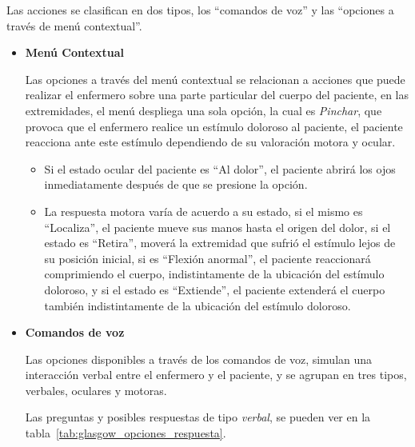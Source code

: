 Las acciones se clasifican en dos tipos, los \enquote{comandos de voz} y las
\enquote{opciones a través de menú contextual}. 

\begin{itemize}
\item{\textbf{Menú Contextual}}

Las opciones a través del menú contextual se relacionan a acciones que puede
realizar el enfermero sobre una parte particular del cuerpo del paciente, en las
extremidades, el menú despliega una sola opción, la cual es \emph{Pinchar}, que
provoca que el enfermero realice un estímulo doloroso al paciente, el
paciente reacciona ante este estímulo dependiendo de su valoración motora y
ocular. 

\begin{itemize}
    \item Si el estado ocular del paciente es \enquote{Al dolor}, el paciente
        abrirá los ojos inmediatamente después de que se presione la opción. 
    \item  La respuesta motora varía de acuerdo a su estado, si el mismo es
        \enquote{Localiza}, el paciente mueve sus manos hasta el origen del
        dolor, si el estado es \enquote{Retira}, moverá la extremidad que
        sufrió el estímulo lejos de su posición inicial, si es
        \enquote{Flexión anormal}, el paciente reaccionará comprimiendo el
        cuerpo, indistintamente de la ubicación del estímulo doloroso, y si el
        estado es \enquote{Extiende}, el paciente extenderá el cuerpo también 
        indistintamente de la ubicación del estímulo doloroso.
\end{itemize}

\item{\textbf{Comandos de voz}}

Las opciones disponibles a través de los comandos de voz, simulan una
interacción verbal entre el enfermero y el paciente, y se agrupan en tres
tipos, verbales, oculares y motoras.

Las preguntas y posibles respuestas de tipo \emph{verbal}, se pueden ver en la
tabla~\ref{tab:glasgow_opciones_respuesta}. 


\end{itemize}
